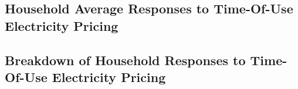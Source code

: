 \subsection{Household Average Responses to Time-Of-Use Electricity Pricing}
\label{Subsection:Household-Average-Responses-to-Time-Of-Use-Electricity-Pricing}



\subsection{Breakdown of Household Responses to Time-Of-Use Electricity Pricing}
\label{Subsection:Breakdown-of-Responses-to-Time-Of-Use-Electricity-Pricing}

